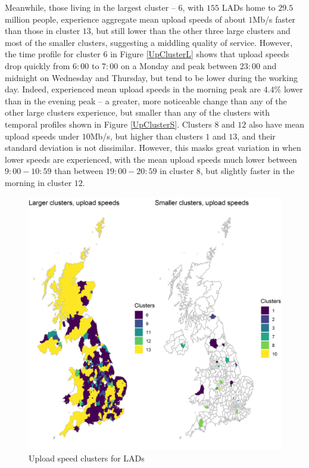 \documentclass[Royal,times,sageh]{sagej}
\begin{document}
Meanwhile, those living in the largest cluster -- \(6\), with \(155\)
LADs home to \(29.5\) million people, experience aggregate mean upload
speeds of about \(1\)Mb/s faster than those in cluster \(13\), but still
lower than the other three large clusters and most of the smaller
clusters, suggesting a middling quality of service. However, the time
profile for cluster \(6\) in Figure \ref{UpClusterL} shows that upload
speeds drop quickly from \(6:00\) to \(7:00\) on a Monday and peak
between \(23:00\) and midnight on Wednesday and Thursday, but tend to be
lower during the working day. Indeed, experienced mean upload speeds in
the morning peak are \(4.4\)\% lower than in the evening peak -- a
greater, more noticeable change than any of the other large clusters
experience, but smaller than any of the clusters with temporal profiles
shown in Figure \ref{UpClusterS}. Clusters \(8\) and \(12\) also have
mean upload speeds under \(10\)Mb/s, but higher than clusters \(1\) and
\(13\), and their standard deviation is not dissimilar. However, this
masks great variation in when lower speeds are experienced, with the
mean upload speeds much lower between \(9:00-10:59\) than between
\(19:00-20:59\) in cluster \(8\), but slightly faster in the morning in
cluster \(12\).

\begin{figure}
\includegraphics[width=0.95\linewidth]{figures/map.up.clusters} \caption{\label{map.up.clusters}Upload speed clusters for LADs}\label{fig:unnamed-chunk-5}
\end{figure}
\end{document}
